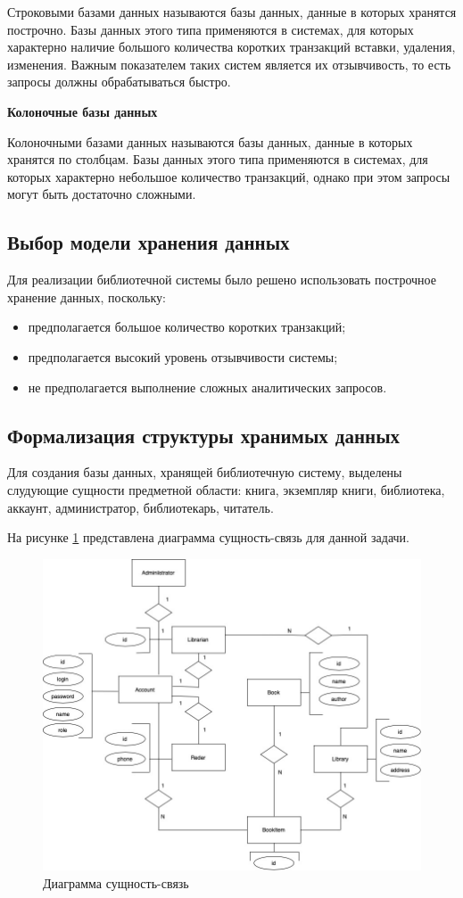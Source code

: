 Строковыми базами данных называются базы данных, данные в которых хранятся построчно. Базы данных этого типа применяются в системах, для которых характерно наличие большого количества коротких транзакций вставки, удаления, изменения. Важным показателем таких систем является их отзывчивость, то есть запросы должны обрабатываться быстро. 


\noindent\textbf{Колоночные базы данных}

Колоночными базами данных называются базы данных, данные в которых хранятся по столбцам. Базы данных этого типа применяются в системах, для которых характерно небольшое количество транзакций, однако при этом запросы могут быть достаточно сложными. 

\subsection{Выбор модели хранения данных}
Для реализации библиотечной системы было решено использовать построчное хранение данных, поскольку:
\begin{itemize}
	\item предполагается большое количество коротких транзакций;
	\item предполагается высокий уровень отзывчивости системы;
	\item не предполагается выполнение сложных аналитических запросов.
\end{itemize}

\subsection{Формализация структуры хранимых данных}
Для создания базы данных, хранящей библиотечную систему, выделены слудующие сущности предметной области: книга, экземпляр книги, библиотека, аккаунт, администратор, библиотекарь, читатель.

На рисунке \ref{fig:er} представлена диаграмма сущность-связь для данной задачи.

\begin{figure}[H]
	\centering
	\includegraphics[width = \linewidth]{img/er_db.jpg}
	\caption{Диаграмма сущность-связь}
	\label{fig:er}
\end{figure}
